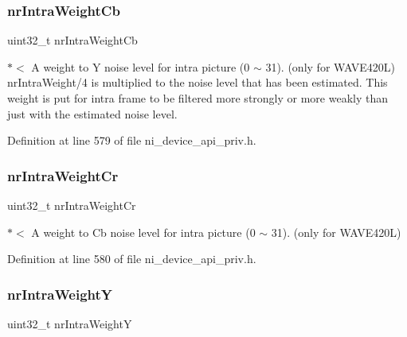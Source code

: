 \mbox{\label{struct__ni__encoder__change__params__t_aa8a865dc5d4a14ca3ca0dcd73f7b8613}} 
\subsubsection{\texorpdfstring{nrIntraWeightCb}{nrIntraWeightCb}}
{\footnotesize\ttfamily uint32\+\_\+t nr\+Intra\+Weight\+Cb}

$\ast$$<$ A weight to Y noise level for intra picture (0 $\sim$ 31). (only for W\+A\+V\+E420L) nr\+Intra\+Weight/4 is multiplied to the noise level that has been estimated. This weight is put for intra frame to be filtered more strongly or more weakly than just with the estimated noise level. 

Definition at line 579 of file ni\+\_\+device\+\_\+api\+\_\+priv.\+h.

\mbox{\label{struct__ni__encoder__change__params__t_a2d292036b89b683d075e6b729abbc47f}} 
\subsubsection{\texorpdfstring{nrIntraWeightCr}{nrIntraWeightCr}}
{\footnotesize\ttfamily uint32\+\_\+t nr\+Intra\+Weight\+Cr}

$\ast$$<$ A weight to Cb noise level for intra picture (0 $\sim$ 31). (only for W\+A\+V\+E420L) 

Definition at line 580 of file ni\+\_\+device\+\_\+api\+\_\+priv.\+h.

\mbox{\label{struct__ni__encoder__change__params__t_ac74e34b49c74dc5c5b039df43a2d6fff}} 
\subsubsection{\texorpdfstring{nrIntraWeightY}{nrIntraWeightY}}
{\footnotesize\ttfamily uint32\+\_\+t nr\+Intra\+WeightY}

